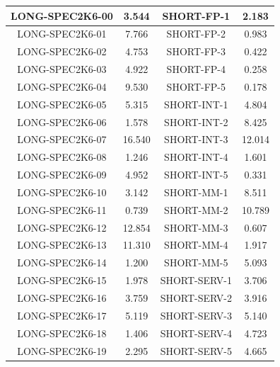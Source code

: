 \documentclass[adobefonts, nocap]{ctexart}
\begin{document}
    \begin{center}
      \begin{tabular}{c|c||c|c}
        LONG-SPEC2K6-00 & 3.544 & SHORT-FP-1 & 2.183 \\ \hline
        LONG-SPEC2K6-01 & 7.766 & SHORT-FP-2 & 0.983 \\ \hline
        LONG-SPEC2K6-02 & 4.753 & SHORT-FP-3 & 0.422 \\ \hline
        LONG-SPEC2K6-03 & 4.922 & SHORT-FP-4 & 0.258 \\ \hline
        LONG-SPEC2K6-04 & 9.530 & SHORT-FP-5 & 0.178 \\ \hline
        LONG-SPEC2K6-05 & 5.315 & SHORT-INT-1 & 4.804 \\ \hline
        LONG-SPEC2K6-06 & 1.578 & SHORT-INT-2 & 8.425 \\ \hline
        LONG-SPEC2K6-07 & 16.540 & SHORT-INT-3 & 12.014 \\ \hline
        LONG-SPEC2K6-08 & 1.246 & SHORT-INT-4 & 1.601 \\ \hline
        LONG-SPEC2K6-09 & 4.952 & SHORT-INT-5 & 0.331 \\ \hline
        LONG-SPEC2K6-10 & 3.142 & SHORT-MM-1 & 8.511 \\ \hline
        LONG-SPEC2K6-11 & 0.739 & SHORT-MM-2 & 10.789 \\ \hline
        LONG-SPEC2K6-12 & 12.854 & SHORT-MM-3 & 0.607 \\ \hline
        LONG-SPEC2K6-13 & 11.310 & SHORT-MM-4 & 1.917 \\ \hline
        LONG-SPEC2K6-14 & 1.200 & SHORT-MM-5 & 5.093 \\ \hline
        LONG-SPEC2K6-15 & 1.978 & SHORT-SERV-1 & 3.706 \\ \hline
        LONG-SPEC2K6-16 & 3.759 & SHORT-SERV-2 & 3.916 \\ \hline
        LONG-SPEC2K6-17 & 5.119 & SHORT-SERV-3 & 5.140 \\ \hline
        LONG-SPEC2K6-18 & 1.406 & SHORT-SERV-4 & 4.723 \\ \hline
        LONG-SPEC2K6-19 & 2.295 & SHORT-SERV-5 & 4.665 \\
      \end{tabular}
    \end{center}
\end{document}
